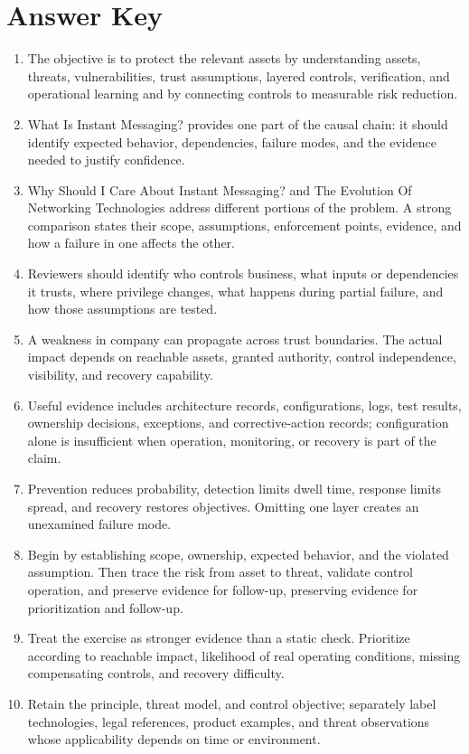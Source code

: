 \documentclass[11pt,letterpaper]{article}
\begin{document}
\section*{Answer Key}
\begin{enumerate}
\item The objective is to protect the relevant assets by understanding assets, threats, vulnerabilities, trust assumptions, layered controls, verification, and operational learning and by connecting controls to measurable risk reduction.
\item What Is Instant Messaging? provides one part of the causal chain: it should identify expected behavior, dependencies, failure modes, and the evidence needed to justify confidence.
\item Why Should I Care About Instant Messaging? and The Evolution Of Networking Technologies address different portions of the problem. A strong comparison states their scope, assumptions, enforcement points, evidence, and how a failure in one affects the other.
\item Reviewers should identify who controls business, what inputs or dependencies it trusts, where privilege changes, what happens during partial failure, and how those assumptions are tested.
\item A weakness in company can propagate across trust boundaries. The actual impact depends on reachable assets, granted authority, control independence, visibility, and recovery capability.
\item Useful evidence includes architecture records, configurations, logs, test results, ownership decisions, exceptions, and corrective-action records; configuration alone is insufficient when operation, monitoring, or recovery is part of the claim.
\item Prevention reduces probability, detection limits dwell time, response limits spread, and recovery restores objectives. Omitting one layer creates an unexamined failure mode.
\item Begin by establishing scope, ownership, expected behavior, and the violated assumption. Then trace the risk from asset to threat, validate control operation, and preserve evidence for follow-up, preserving evidence for prioritization and follow-up.
\item Treat the exercise as stronger evidence than a static check. Prioritize according to reachable impact, likelihood of real operating conditions, missing compensating controls, and recovery difficulty.
\item Retain the principle, threat model, and control objective; separately label technologies, legal references, product examples, and threat observations whose applicability depends on time or environment.
\end{enumerate}
\end{document}
